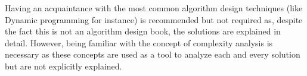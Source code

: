 Having an acquaintance with the most common algorithm design techniques (like Dynamic programming for instance) is recommended but not required as, despite the fact this is not an algorithm design book, the solutions are explained in detail. However, being familiar with the concept of complexity analysis is necessary as these concepts are used as a tool to analyze each and every solution but are not explicitly explained.